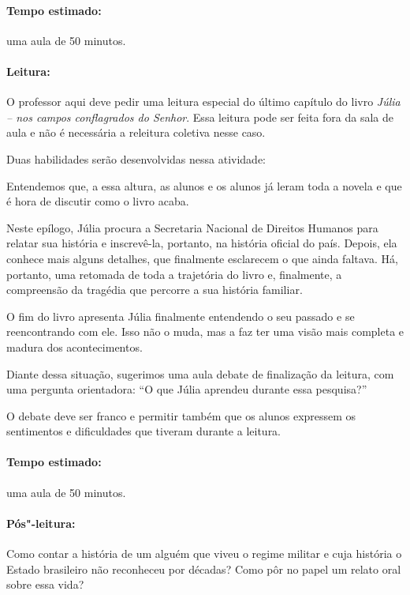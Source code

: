 \documentclass[12pt]{extarticle}
\begin{document}
\paragraph{Tempo estimado:} uma aula de 50 minutos.

\paragraph{Leitura:}

O professor aqui deve pedir uma leitura especial do último capítulo do
livro \emph{Júlia -- nos campos conflagrados do Senhor}. Essa leitura
pode ser feita fora da sala de aula e não é necessária a releitura
coletiva nesse caso.

Duas habilidades serão desenvolvidas nessa atividade:

Entendemos que, a essa altura, as alunos e os alunos já leram toda a
novela e que é hora de discutir como o livro acaba.

Neste epílogo, Júlia procura a Secretaria Nacional de Direitos Humanos
para relatar sua história e inscrevê-la, portanto, na história oficial
do país. Depois, ela conhece mais alguns detalhes, que finalmente
esclarecem o que ainda faltava. Há, portanto, uma retomada de toda a
trajetória do livro e, finalmente, a compreensão da tragédia que
percorre a sua história familiar.

O fim do livro apresenta Júlia finalmente entendendo o seu passado e se
reencontrando com ele. Isso não o muda, mas a faz ter uma visão mais
completa e madura dos acontecimentos.

Diante dessa situação, sugerimos uma aula debate de finalização da
leitura, com uma pergunta orientadora: ``O que Júlia aprendeu durante
essa pesquisa?''

O debate deve ser franco e permitir também que os alunos expressem os
sentimentos e dificuldades que tiveram durante a leitura.

\paragraph{Tempo estimado:} uma aula de 50 minutos.

\paragraph{Pós"-leitura:}

Como contar a história de um alguém que viveu o regime militar e cuja
história o Estado brasileiro não reconheceu por décadas? Como pôr no papel um relato oral sobre essa vida?
\end{document}

